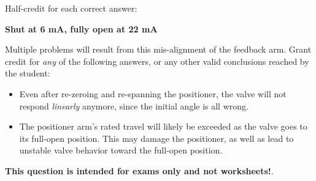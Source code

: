 







Half-credit for each correct answer:

\vskip 10pt

\item{} {\bf Shut at 6 mA, fully open at 22 mA}

\vskip 10pt

Multiple problems will result from this mis-alignment of the feedback arm.  Grant credit for {\it any} of the following answers, or any other valid conclusions reached by the student:

\begin{itemize}
\item{} Even after re-zeroing and re-spanning the positioner, the valve will not respond {\it linearly} anymore, since the initial angle is all wrong.
\item{} The positioner arm's rated travel will likely be exceeded as the valve goes to its full-open position.  This may damage the positioner, as well as lead to unstable valve behavior toward the full-open position.
\end{itemize}








{\bf This question is intended for exams only and not worksheets!}.



